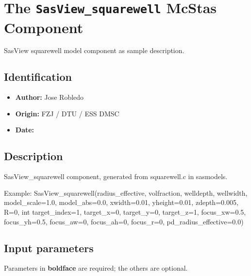\section{The \texttt{SasView\_squarewell} McStas Component}
SasView squarewell model component as sample description.

\subsection*{Identification}
\begin{itemize}
  \item \textbf{Author:} Jose Robledo
  \item \textbf{Origin:} FZJ / DTU / ESS DMSC
  \item \textbf{Date:} 
\end{itemize}

\subsection*{Description}
SasView\_squarewell component, generated from squarewell.c in sasmodels.

Example: SasView\_squarewell(radius\_effective, volfraction, welldepth, wellwidth, model\_scale=1.0, model\_abs=0.0, xwidth=0.01, yheight=0.01, zdepth=0.005, R=0, int target\_index=1, target\_x=0, target\_y=0, target\_z=1, focus\_xw=0.5, focus\_yh=0.5, focus\_aw=0, focus\_ah=0, focus\_r=0, pd\_radius\_effective=0.0)

\subsection*{Input parameters}
Parameters in \textbf{boldface} are required; the others are optional.

